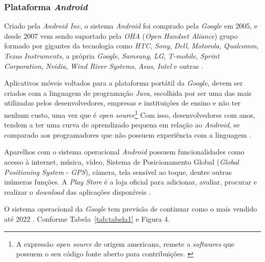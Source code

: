 \subsubsection{Plataforma \textit{Android}}

Criado pela \textit{Android Inc}, o sistema \textit{Android} foi comprado pela \textit{Google} em 2005, e desde 2007 vem sendo suportado pela \textit{OHA} (\textit{Open Handset Aliance}) grupo formado por gigantes da tecnologia como \textit{HTC}, \textit{Sony}, \textit{Dell}, \textit{Motorola}, \textit{Qualcomm}, \textit{Texas Instruments}, a própria \textit{Google}, \textit{Samsung}, \textit{LG}, \textit{T-mobile}, \textit{Sprint Corporation}, \textit{Nvidia}, \textit{Wind River Systems}, \textit{Asus}, \textit{Intel} e outras \cite{DeitelDeitelWald2016}.

Aplicativos móveis voltados para a plataforma portátil da \textit{Google}, devem ser criados com a linguagem de programação \textit{Java}, escolhida por ser uma das mais utilizadas pelos desenvolvedores, empresas e instituições de ensino e não ter nenhum custo, uma vez que é \textit{open source}\footnote{A expressão \textit{open source} de origem americana, remete a \textit{softwares} que possuem o seu código fonte aberto para contribuições. \cite{openSourceCanalTech}}  Com isso, desenvolvedores com anos, tendem a ter uma curva de aprendizado pequena em relação ao \textit{Android}, se comparado aos programadores que não possuem experiência com a linguagem \cite{DeitelDeitelWald2016}.

Aparelhos com o sistema operacional \textit{Android} possuem funcionalidades como acesso à internet, música, vídeo, Sistema de Posicionamento Global (\textit{Global Positioning System} - \textit{GPS}), câmera, tela sensível ao toque, dentre outras inúmeras funções. A \textit{Play Store} é a loja oficial para adicionar, avaliar, procurar e realizar o \textit{download} das aplicações disponíveis \cite{DeitelDeitel2016}.

O sistema operacional da \textit{Google} tem previsão de continuar como o mais vendido até 2022 \cite{IDC}. Conforme Tabela~\ref{tab:tabela1} e Figura 4.

